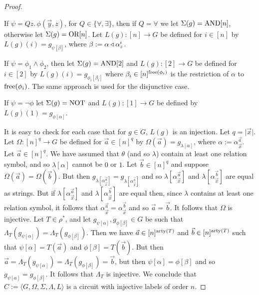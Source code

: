 \documentclass[../main/thesis.tex]{subfiles}
\begin{document}
\begin{proof}
\begin{myitemize}
  \item If $\psi = Q z . \, \phi(\vec{y}, z)$, for $Q \in \{\forall, \exists\}$,
    then if $Q = \forall$ we let $\Sigma (g) = \text{\upshape AND}[n]$, otherwise let $\Sigma
    (g) = \text{\upshape OR}[n]$. Let $L(g) : [n] \rightarrow G$ be defined for $i \in [n]$ by
    $L(g)(i) = g_{\psi[\beta]}$, where $\beta := \alpha \triangleleft\alpha^i_z$.
  \item If $\psi = \phi_1 \land \phi_2$, then let $\Sigma(g) = \text{\upshape AND}[2]$ and
    $L(g) : [2] \rightarrow G$ be defined for $i \in [2]$ by $L(g)(i) =
    g_{\phi_i[\beta_i]}$ where $\beta_i \in [n]^{\mathrm{free}(\phi_i)}$ is the
    restriction of $\alpha$ to $\mathrm{free}(\phi_i)$. The same approach is used for
    the disjunctive case.
  \item If $\psi = \neg \phi$ let $\Sigma (g) = \text{\upshape NOT}$ and $L(g): [1] \rightarrow
    G$ be defined by $L(g)(1) = g_{\phi[\alpha]}$.
  \end{myitemize}
  It is easy to check for each case that for $g \in G$, $L(g)$ is an injection.
  Let $q = \vert \vec{x} \vert$. Let $\Omega : [n]^{q} \rightarrow G$ be defined
  for $\vec{a} \in [n]^q$ by $\Omega (\vec{a}) = g_{\lambda [\alpha]}$, where
  $\alpha := \alpha^{\vec{a}}_{\vec{x}}$. Let $\vec{a} \in [n]^q$. We have
  assumed that $\theta$ (and so $\lambda$) contain at least one relation symbol,
  and so $\lambda[\alpha]$ cannot be $0$ or $1$. Let $\vec{b} \in [n]^q$ and
  suppose $\Omega (\vec{a}) = \Omega(\vec{b})$. But then
  $g_{\lambda[\alpha^{\vec{a}}_{\vec{x}}]} =
  g_{\lambda[\alpha^{\vec{b}}_{\vec{x}}]}$ and so
  $\lambda[\alpha^{\vec{a}}_{\vec{x}}]$ and
  $\lambda[\alpha^{\vec{b}}_{\vec{x}}]$ are equal as strings. But if
  $\lambda[\alpha^{\vec{a}}_{\vec{x}}]$ and
  $\lambda[\alpha^{\vec{b}}_{\vec{x}}]$ are equal then, since $\lambda$ contains
  at least one relation symbol, it follows that $\alpha^{\vec{a}}_{\vec{x}} =
  \alpha^{\vec{b}}_{\vec{x}}$ and so $\vec{a} = \vec{b}$. It follows that
  $\Omega$ is injective. Let $T \in \rho^*$, and let $g_{\psi[\alpha]},
  g_{\phi[\beta]} \in G$ be such that $\Lambda_T (g_{\psi[\alpha]}) = \Lambda_T
  (g_{\phi[\beta]})$. Then we have $\vec{a} \in [n]^{\mathrm{arty}(T)}$ and $\vec{b} \in
  [n]^{\mathrm{arty}(T)}$ such that $\psi[\alpha] = T(\vec{a})$ and $\phi[\beta] =
  T(\vec{b})$. But then $\vec{a} = \Lambda_T (g_{\psi[\alpha]}) = \Lambda_T
  (g_{\phi[\beta]}) = \vec{b}$, but then $\psi[\alpha] = \phi[\beta]$ and so
  $g_{\psi[\alpha]} = g_{\phi[\beta]}$. It follows that $\Lambda_T$ is
  injective. We conclude that $C := \langle G, \Omega, \Sigma, \Lambda, L
  \rangle$ is a circuit with injective labels of order $n$.


\end{proof}
\end{document}
